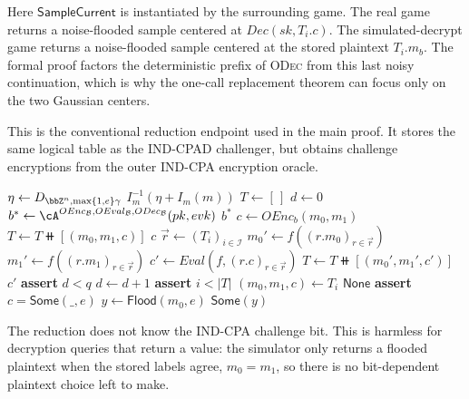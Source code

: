 Here \(\mathsf{SampleCurrent}\) is instantiated by the surrounding game.
The real game returns a noise-flooded sample centered at $Dec(sk,T_i.c)$.
The simulated-decrypt game returns a noise-flooded sample centered at the stored plaintext $T_i.m_b$.
The formal proof factors the deterministic prefix of \textsc{ODec} from this last noisy continuation, which is why the one-call replacement theorem can focus only on the two Gaussian centers.

\begin{algorithm}
\caption{IND-CPA reduction adversary $\mathcal{B}_{\cA}$}
\label{alg:ind-cpa-reduction}
This is the conventional reduction endpoint used in the main proof.
It stores the same logical table as the IND-CPAD challenger, but obtains
challenge encryptions from the outer IND-CPA encryption oracle.
\begin{algorithmic}[1]
    \State $\eta \gets D_{\bbZ^n,\max\{1,e\}\gamma}$
    \State \Return $I_m^{-1}(\eta+I_m(m))$
  \EndProcedure
  \Statex
    \State $T \gets [\,]$
    \State $d \gets 0$
    \State $b^* \gets
      \cA^{OEnc_{\mathcal{B}},OEval_{\mathcal{B}},ODec_{\mathcal{B}}}(pk,evk)$
    \State \Return $b^*$
  \EndProcedure
  \Statex
    \State $c \gets OEnc_b(m_0,m_1)$
    \State $T \gets T \doubleplus [(m_0,m_1,c)]$
    \State \Return $c$
  \EndProcedure
  \Statex
    \State $\vec r \gets (T_i)_{i\in\mathcal{I}}$
    \State $m_0' \gets f((r.m_0)_{r\in\vec r})$
    \State $m_1' \gets f((r.m_1)_{r\in\vec r})$
    \State $c' \gets Eval(f,(r.c)_{r\in\vec r})$
    \State $T \gets T \doubleplus [(m_0',m_1',c')]$
    \State \Return $c'$
  \EndProcedure
  \Statex
    \State \textbf{assert} $d<q$
    \State $d \gets d+1$
    \State \textbf{assert} $i<|T|$
    \State $(m_0,m_1,c) \gets T_i$
      \State \Return $\mathsf{None}$
    \EndIf
    \State \textbf{assert} $c=\mathsf{Some}(\_,e)$
    \State $y \gets \mathsf{Flood}(m_0,e)$
    \State \Return $\mathsf{Some}(y)$
  \EndProcedure
\end{algorithmic}
\end{algorithm}

The reduction does not know the IND-CPA challenge bit.
This is harmless for decryption queries that return a value: the simulator only returns a flooded plaintext when the stored labels agree, $m_0=m_1$, so there is no bit-dependent plaintext choice left to make.
